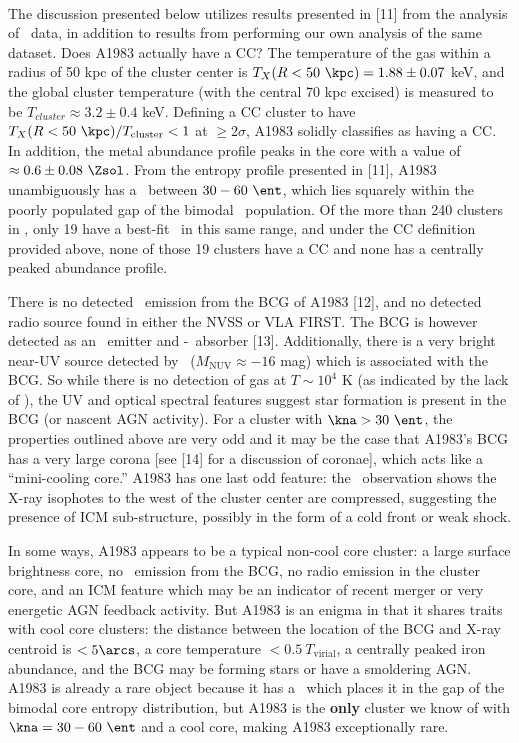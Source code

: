 \documentclass[letterpaper,11pt,twocolumn]{article}
\begin{document}
\\
The discussion presented below utilizes results presented in [11] from
the analysis of \xmm\ data, in addition to results from performing our
own analysis of the same dataset. Does A1983 actually have a CC? The
temperature of the gas within a radius of 50 kpc of the cluster center
is $T_X(R < 50~\kpc) = 1.88 \pm 0.07$ keV, and the global cluster
temperature (with the central 70 kpc excised) is measured to be
$T_{cluster} \approx 3.2 \pm 0.4$ keV. Defining a CC cluster to have
$T_X(R < 50~\kpc) / T_{\mathrm{cluster}} < 1$ at $\ge 2\sigma$, A1983
solidly classifies as having a CC. In addition, the metal abundance
profile peaks in the core with a value of $\approx 0.6 \pm
0.08~\Zsol$. From the entropy profile presented in [11], A1983
unambiguously has a \kna\ between $30-60 ~\ent$, which lies squarely
within the poorly populated gap of the bimodal \kna\ population. Of
the more than 240 clusters in \accept, only 19 have a best-fit
\kna\ in this same range, and under the CC definition provided above,
none of those 19 clusters have a CC and none has a centrally peaked
abundance profile.

There is no detected \halpha\ emission from the BCG of A1983 [12], and
no detected radio source found in either the NVSS or VLA FIRST. The
BCG is however detected as an \oii\ emitter and
\hdelta-\hbeta\ absorber [13]. Additionally, there is a very bright
near-UV source detected by \galex\ ($M_{\mathrm{NUV}} \approx -16$
mag) which is associated with the BCG. So while there is no detection
of gas at $T \sim 10^4$ K (as indicated by the lack of \halpha), the
UV and optical spectral features suggest star formation is present in
the BCG (or nascent AGN activity). For a cluster with $\kna >
30~\ent$, the properties outlined above are very odd and it may be the
case that A1983's BCG has a very large corona [see [14] for a
  discussion of coronae], which acts like a ``mini-cooling core.''
A1983 has one last odd feature: the \xmm\ observation shows the X-ray
isophotes to the west of the cluster center are compressed, suggesting
the presence of ICM sub-structure, possibly in the form of a cold
front or weak shock.

In some ways, A1983 appears to be a typical non-cool core cluster: a
large surface brightness core, no \halpha\ emission from the BCG, no
radio emission in the cluster core, and an ICM feature which may be an
indicator of recent merger or very energetic AGN feedback
activity. But A1983 is an enigma in that it shares traits with cool
core clusters: the distance between the location of the BCG and X-ray
centroid is $< 5\arcs$, a core temperature $< 0.5
~T_{\mathrm{virial}}$, a centrally peaked iron abundance, and the BCG
may be forming stars or have a smoldering AGN. A1983 is already a rare
object because it has a \kna\ which places it in the gap of the
bimodal core entropy distribution, but A1983 is the {\bf{only}}
cluster we know of with $\kna = 30-60~\ent$ and a cool core, making
A1983 exceptionally rare.\\
\end{document}
